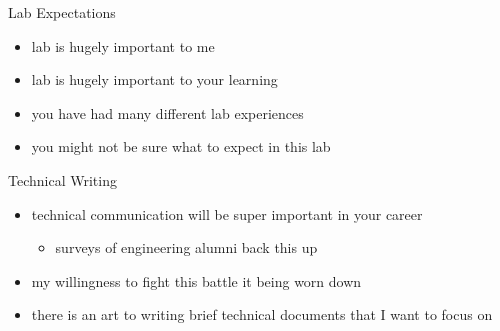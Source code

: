 \begin{frame}{Lab Expectations}
\label{lab-expectations}
\begin{itemize}
\tightlist
\item
  lab is hugely important to me
\item
  lab is hugely important to your learning
\item
  you have had many different lab experiences
\item
  you might not be sure what to expect in this lab
\end{itemize}
\end{frame}

\begin{frame}{Technical Writing}
\label{technical-writing}
\begin{itemize}
\tightlist
\item
  technical communication will be super important in your career

  \begin{itemize}
  \tightlist
  \item
    surveys of engineering alumni back this up
  \end{itemize}
\item
  my willingness to fight this battle it being worn down
\item
  there is an art to writing brief technical documents that I want to
  focus on
\end{itemize}
\end{frame}

